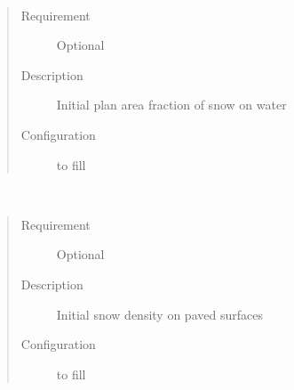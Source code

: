 \documentclass[letterpaper,10pt,english]{sphinxmanual}
\begin{document}

\begin{fulllineitems}
\label{\detokenize{input_files/Initial_Conditions/Snow_related_parameters:cmdoption-arg-snowfracwater}}~\begin{quote}\begin{description}
\item[{Requirement}] \leavevmode
Optional

\item[{Description}] \leavevmode
Initial plan area fraction of snow on water

\item[{Configuration}] \leavevmode
to fill

\end{description}\end{quote}

\end{fulllineitems}


\begin{fulllineitems}
\label{\detokenize{input_files/Initial_Conditions/Snow_related_parameters:cmdoption-arg-snowdenspaved}}~\begin{quote}\begin{description}
\item[{Requirement}] \leavevmode
Optional

\item[{Description}] \leavevmode
Initial snow density on paved surfaces

\item[{Configuration}] \leavevmode
to fill

\end{description}\end{quote}

\end{fulllineitems}

\end{document}
